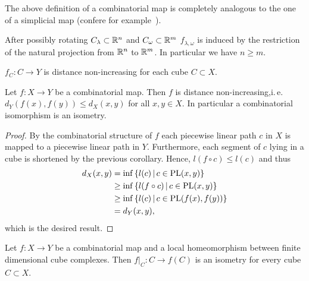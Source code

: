 \begin{rem}
  The above definition of a combinatorial map is completely analogous to the one of a simplicial map (confere for example~\cite{Singer}).
\end{rem}

\begin{lemma}
  After possibly rotating \(C_\lambda \subset \mathbb{R}^n\) and \(C_\omega \subset \mathbb{R}^m\) \(f_{\lambda, \omega}\) is induced by the restriction of the natural projection from \(\mathbb{R}^n\) to \(\mathbb{R}^m\). In particular we have \(n \geq m\).
\end{lemma}

\begin{cor}
  \(f_C\colon C \to Y\) is distance non-increasing for each cube \(C \subset X\).
\end{cor}

\begin{prop}
  Let \(f\colon X \to Y\) be a combinatorial map. Then \(f\) is distance non-increasing,i.\,e.\ \(d_Y(f(x), f(y)) \leq d_X(x,y)\) for all \(x,y \in X\). In particular a combinatorial isomorphism is an isometry.
\end{prop}

\begin{proof}
  By the combinatorial structure of \(f\) each piecewise linear path \(c\) in \(X\) is mapped to a piecewise linear path in \(Y\). Furthermore, each segment of \(c\) lying in a cube is shortened by the previous corollary. Hence, \(l(f \circ c) \leq l(c)\) and thus
  \begin{align*}
    d_X(x,y)
    & = \inf\left\{l(c) \,\middle|\, c \in \operatorname{PL}(x,y)\right\}\\
    & \geq \inf\left\{l(f \circ c) \,\middle|\, c \in \operatorname{PL}(x,y)\right\}\\
    & \geq \inf\left\{l(c) \,\middle|\, c \in \operatorname{PL}(f(x), f(y))\right\}\\
    & = d_Y(x,y),
  \end{align*}
  which is the desired result.
\end{proof}

\begin{lemma}
  Let \(f\colon X \to Y\) be a combinatorial map and a local homeomorphism between finite dimensional cube complexes. Then \(f|_C\colon C \to f(C)\) is an isometry for every cube \(C \subset X\).
\end{lemma}

